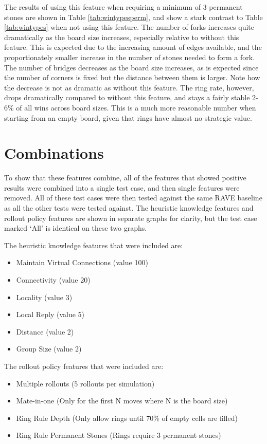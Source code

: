 The results of using this feature when requiring a minimum of 3 permanent stones are shown in Table \ref{tab:wintypesperm}, and show a stark contrast to Table \ref{tab:wintypes} when not using this feature. The number of forks increases quite dramatically as the board size increases, especially relative to without this feature. This is expected due to the increasing amount of edges available, and the proportionately smaller increase in the number of stones needed to form a fork. The number of bridges decreases as the board size increases, as is expected since the number of corners is fixed but the distance between them is larger. Note how the decrease is not as dramatic as without this feature. The ring rate, however, drops dramatically compared to without this feature, and stays a fairly stable 2-6\% of all wins across board sizes. This is a much more reasonable number when starting from an empty board, given that rings have almost no strategic value.

\section{Combinations}

To show that these features combine, all of the features that showed positive results were combined into a single test case, and then single features were removed. All of these test cases were then tested against the same RAVE baseline as all the other tests were tested against. The heuristic knowledge features and rollout policy features are shown in separate graphs for clarity, but the test case marked `All' is identical on these two graphs.

The heuristic knowledge features that were included are:
\vspace{-5mm}
\begin{itemize}
	\setlength{\itemsep}{0pt}
	\setlength{\parskip}{0pt}
	\setlength{\parsep}{0pt}
\item Maintain Virtual Connections (value 100)
\item Connectivity (value 20)
\item Locality (value 3)
\item Local Reply (value 5)
\item Distance (value 2)
\item Group Size (value 2)
\end{itemize}

The rollout policy features that were included are:
\vspace{-5mm}
\begin{itemize}
	\setlength{\itemsep}{0pt}
	\setlength{\parskip}{0pt}
	\setlength{\parsep}{0pt}
\item Multiple rollouts (5 rollouts per simulation)
\item Mate-in-one (Only for the first N moves where N is the board size)
\item Ring Rule Depth (Only allow rings until 70\% of empty cells are filled)
\item Ring Rule Permanent Stones (Rings require 3 permanent stones)
\end{itemize}



